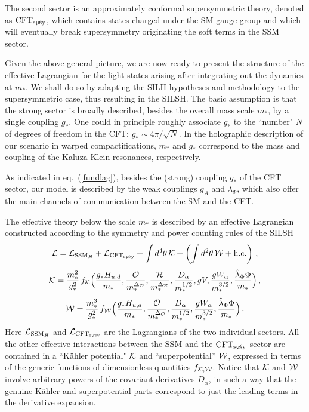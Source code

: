 \documentclass[a4paper,12pt]{article}
\newcommand{\hc}{{\rm h.c.}}
\newcommand{\beq}{\begin{equation}}
\newcommand{\eeq}{\end{equation}}
\def\eq#1{eq.~(\ref{#1})}
\def\eq#1{eq.~(\ref{#1})}
\def\O{\mathcal{O}}
\def\R{\mathcal{R}}
\def\mst{m_*}
\def\SSMnH{{\rm SSM}_{H \!\!\!\!\!\not\,\,\,\,\,}}
\def\CFTs{{\rm CFT}_ {{\rm susy}\! \! \! \! \! \! \! \!\diagup \,\,\,}}
\def\hlambda{\hat\lambda}
\begin{document}
The second sector is an approximately conformal supersymmetric theory, denoted as $\CFTs$, which contains states charged under the SM gauge group and which will eventually break supersymmetry  originating the soft terms in  the SSM sector. 

Given  the above general picture, we are now ready to present the structure of the effective Lagrangian for the light states arising after integrating out the dynamics at $\mst$. We shall do so by 
adapting  the SILH hypotheses and methodology to the supersymmetric case, thus resulting  in the SILSH.
The basic assumption is that the strong sector is broadly described, besides the overall mass scale $\mst$, by a single coupling $g_*$. One could in principle roughly associate $g_*$ to the ``number" $N$ of degrees of freedom in the CFT: $g_*\sim 4\pi /\sqrt N$. 
In the holographic description of our scenario in warped compactifications, $\mst$ and $g_*$ correspond to the mass and coupling of the Kaluza-Klein resonances, respectively.

As indicated in \eq{fundlag}, besides the (strong) coupling $g_*$ of the CFT sector, our  model is described by 
the weak couplings $g_A$ and $\lambda_\Phi$, which also offer the main channels of communication between the SM and the CFT.  

The effective theory below the scale $\mst$ is described by an effective Lagrangian constructed according to the symmetry and power counting rules  of the SILSH
\beq
{\cal L} = {\cal L}_{\SSMnH} +{\cal L}_{\CFTs} + \int d^4 \theta \, {\cal K} 
+
\left( \int d^2 \theta \,  {\cal W}  + \hc \right)\, ,
\label{lsilsh}
\eeq
\beq
{\cal K}=\frac{\mst^2}{g_*^2}\, f_{\cal K}
\Big(  \frac{g_* H_{u,d}}{\mst}, \frac{\O}{\mst^{\Delta_{\O}}}, \frac{\R}{\mst^{\Delta_{\R}}},\frac{D_\alpha}{\mst^{1/2}},gV,\frac{gW_\alpha}{\mst^{3/2}}, \frac{\hlambda_\Phi \Phi}{\mst}\Big) \, ,
\label{genK}
\eeq
\beq
{\cal W}=\frac{\mst^3}{g_*^2}\, f_{\cal W} \Big(  \frac{g_* H_{u,d}}{\mst}, \frac{\O}{\mst^{\Delta_{\O}}}, \frac{D_\alpha}{\mst^{1/2}},\frac{gW_\alpha}{\mst^{3/2}}, \frac{\hlambda_\Phi \Phi}{\mst}\Big) \, .
\label{genW}
\eeq
Here ${\cal L}_{\SSMnH}$ and ${\cal L}_{\CFTs}$ are the Lagrangians of the two individual sectors.
All the other effective interactions between the SSM and the $\CFTs$ sector are contained in a ``K\"ahler potential" ${\cal K}$ and ``superpotential'' ${\cal W}$, expressed in terms of the generic functions of dimensionless quantities $f_{{\cal K},{\cal W}}$. Notice  that 
$\cal K$ and $\cal W$ involve arbitrary powers of the covariant derivatives $D_\alpha$, in such a way that the genuine K\"ahler and superpotential parts correspond  to just the leading terms in the derivative expansion.
\end{document}
